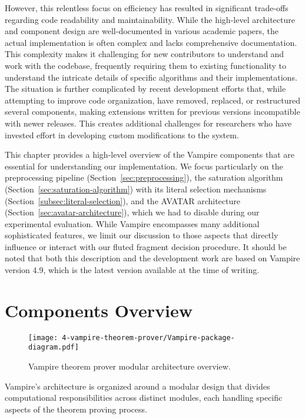 However, this relentless focus on efficiency has resulted in significant trade-offs regarding code readability and maintainability.
While the high-level architecture and component design are well-documented in various academic papers, the actual implementation is often complex and lacks comprehensive documentation.
This complexity makes it challenging for new contributors to understand and work with the codebase, frequently requiring them to  existing functionality to understand the intricate details of specific algorithms and their implementations.
The situation is further complicated by recent development efforts that, while attempting to improve code organization, have removed, replaced, or restructured several components, making extensions written for previous versions incompatible with newer releases.
This creates additional challenges for researchers who have invested effort in developing custom modifications to the system.

This chapter provides a high-level overview of the Vampire components that are essential for understanding our implementation.
We focus particularly on the preprocessing pipeline (Section~\ref{sec:preprocessing}), the saturation algorithm (Section~\ref{sec:saturation-algorithm}) with its literal selection mechanisms (Section~\ref{subsec:literal-selection}), and the AVATAR architecture (Section~\ref{sec:avatar-architecture}), which we had to disable during our experimental evaluation.
While Vampire encompasses many additional sophisticated features, we limit our discussion to those aspects that directly influence or interact with our fluted fragment decision procedure.
It should be noted that both this description and the development work are based on Vampire version 4.9, which is the latest version available at the time of writing.

\section{Components Overview}\label{sec:components-overview}

\begin{figure}[H]
  \centering
  \texttt{[image: 4-vampire-theorem-prover/Vampire-package-diagram.pdf]}
  \caption{Vampire theorem prover modular architecture overview.}\label{fig:vampire-architecture}
\end{figure}

Vampire's architecture is organized around a modular design that divides computational responsibilities across distinct modules, each handling specific aspects of the theorem proving process.

